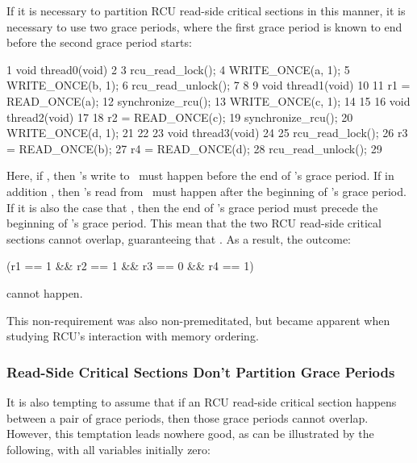 If it is necessary to partition RCU read-side critical sections in this
manner, it is necessary to use two grace periods, where the first grace
period is known to end before the second grace period starts:

\begin{VerbatimN}
       1 void thread0(void)
       2 {
       3   rcu_read_lock();
       4   WRITE_ONCE(a, 1);
       5   WRITE_ONCE(b, 1);
       6   rcu_read_unlock();
       7 }
       8
       9 void thread1(void)
      10 {
      11   r1 = READ_ONCE(a);
      12   synchronize_rcu();
      13   WRITE_ONCE(c, 1);
      14 }
      15
      16 void thread2(void)
      17 {
      18   r2 = READ_ONCE(c);
      19   synchronize_rcu();
      20   WRITE_ONCE(d, 1);
      21 }
      22
      23 void thread3(void)
      24 {
      25   rcu_read_lock();
      26   r3 = READ_ONCE(b);
      27   r4 = READ_ONCE(d);
      28   rcu_read_unlock();
      29 }
\end{VerbatimN}

Here, if , then 's write to~ must happen
before the end of 's grace period.
If in addition
, then 's read from~ must happen after
the beginning of 's grace period.
If it is also the case
that , then the end of 's grace period must
precede the beginning of 's grace period.
This mean that
the two RCU read-side critical sections cannot overlap, guaranteeing
that .
As a result, the outcome:

\begin{VerbatimU}
      (r1 == 1 && r2 == 1 && r3 == 0 && r4 == 1)
\end{VerbatimU}

\noindent%
cannot happen.

This non-requirement was also non-premeditated, but became apparent when
studying RCU's interaction with memory ordering.


\subsubsection{Read-Side Critical Sections Don't Partition Grace Periods}

It is also tempting to assume that if an RCU read-side critical section
happens between a pair of grace periods, then those grace periods cannot
overlap.
However, this temptation leads nowhere good, as can be
illustrated by the following, with all variables initially zero:

